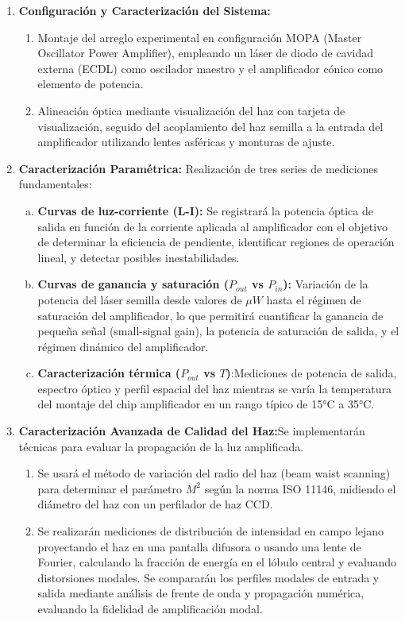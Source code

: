\documentclass[12pt]{article}
\begin{document}
\begin{enumerate}
  \item \textbf{Configuración y Caracterización del Sistema:}
  \begin{enumerate}[$\bullet$] 
    \item Montaje del arreglo experimental en configuración MOPA (Master Oscillator Power Amplifier), empleando un láser de diodo de cavidad externa (ECDL) como oscilador maestro y el amplificador cónico como elemento de potencia.
    \item Alineación óptica mediante visualización del haz con tarjeta de visualización, seguido del acoplamiento del haz semilla a la entrada del amplificador utilizando lentes asféricas y monturas de ajuste.
  \end{enumerate}
  \item \textbf{Caracterización Paramétrica:}
  Realización de tres series de mediciones fundamentales:
  \begin{enumerate}[a)]
    \item \textbf{Curvas de luz-corriente (L-I):} Se registrará la potencia óptica de salida en función de la corriente aplicada al amplificador con el objetivo de determinar la eficiencia de pendiente, identificar regiones de operación lineal, y detectar posibles inestabilidades.
    \item  \textbf{Curvas de ganancia y saturación ($P_{out}$ vs $P_{in}$):} Variación de la potencia del láser semilla desde valores de $\mu W$ hasta el régimen de saturación del amplificador, lo que permitirá cuantificar la ganancia de pequeña señal (small-signal gain), la potencia de saturación de salida, y el régimen dinámico del amplificador.
    \item \textbf{Caracterización térmica ($P_{out}$ vs $T$)}:Mediciones de potencia de salida, espectro óptico y perfil espacial del haz mientras se varía la temperatura del montaje del chip amplificador en un rango típico de 15°C a 35°C.
  \end{enumerate}
  \item \textbf{Caracterización Avanzada de Calidad del Haz:}Se implementarán técnicas para evaluar la propagación de la luz amplificada.
  \begin{enumerate}[$\bullet$]
    \item Se usará el método de variación del radio del haz (beam waist scanning) para determinar el parámetro $M^2$ según la norma ISO 11146, midiendo el diámetro del haz con un perfilador de haz CCD. 
    \item Se realizarán mediciones de distribución de intensidad en campo lejano proyectando el haz en una pantalla difusora o usando una lente de Fourier, calculando la fracción de energía en el lóbulo central y evaluando distorsiones modales. Se compararán los perfiles modales de entrada y salida mediante análisis de frente de onda y propagación numérica, evaluando la fidelidad de amplificación modal. 

\end{enumerate}
\end{enumerate}
\end{document}
